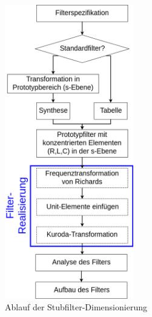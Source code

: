 \begin{figure}[h!]
\centering
 	\includegraphics[width=0.5\textwidth]{Ablauf_Filterdimensionierung.png}
 	\caption{Ablauf der Stubfilter-Dimensionierung}
 	\label{fig:Ablauf_Filterdimensionierung}
\end{figure}
